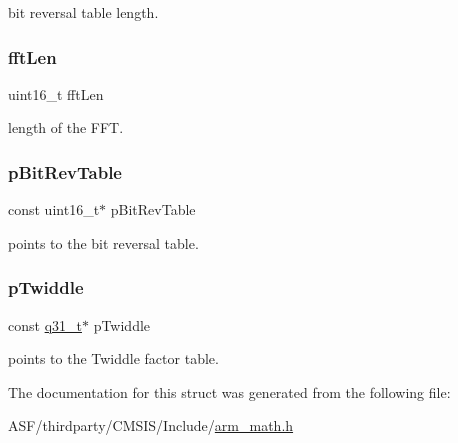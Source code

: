 bit reversal table length. \mbox{\label{structarm__cfft__instance__q31_ab8db3bbe7c61e6bb8ca2a55e3446e11a}} 
\subsubsection{\texorpdfstring{fftLen}{fftLen}}
{\footnotesize\ttfamily uint16\+\_\+t fft\+Len}

length of the F\+FT. \mbox{\label{structarm__cfft__instance__q31_a3b229432d381b0a511a9cdbe3aa74e78}} 
\subsubsection{\texorpdfstring{pBitRevTable}{pBitRevTable}}
{\footnotesize\ttfamily const uint16\+\_\+t$\ast$ p\+Bit\+Rev\+Table}

points to the bit reversal table. \mbox{\label{structarm__cfft__instance__q31_a9760c603af5d85652496dbffd63a8a2e}} 
\subsubsection{\texorpdfstring{pTwiddle}{pTwiddle}}
{\footnotesize\ttfamily const \mbox{\hyperlink{arm__math_8h_adc89a3547f5324b7b3b95adec3806bc0}{q31\+\_\+t}}$\ast$ p\+Twiddle}

points to the Twiddle factor table. 

The documentation for this struct was generated from the following file\+:\begin{DoxyCompactItemize}
\item 
A\+S\+F/thirdparty/\+C\+M\+S\+I\+S/\+Include/\mbox{\hyperlink{arm__math_8h}{arm\+\_\+math.\+h}}\end{DoxyCompactItemize}
